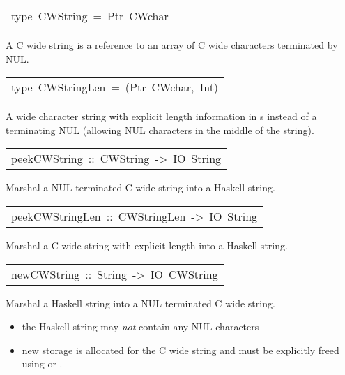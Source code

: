 \begin{haddockdesc}
\item[\begin{tabular}{@{}l}
type\ CWString\ =\ Ptr\ CWchar
\end{tabular}]\haddockbegindoc
A C wide string is a reference to an array of C wide characters
 terminated by NUL.
\par

\end{haddockdesc}
\begin{haddockdesc}
\item[\begin{tabular}{@{}l}
type\ CWStringLen\ =\ (Ptr\ CWchar,\ Int)
\end{tabular}]\haddockbegindoc
A wide character string with explicit length information in s
 instead of a terminating NUL (allowing NUL characters in the middle
 of the string).
\par

\end{haddockdesc}
\begin{haddockdesc}
\item[\begin{tabular}{@{}l}
peekCWString\ ::\ CWString\ ->\ IO\ String
\end{tabular}]\haddockbegindoc
Marshal a NUL terminated C wide string into a Haskell string.
\par

\end{haddockdesc}
\begin{haddockdesc}
\item[\begin{tabular}{@{}l}
peekCWStringLen\ ::\ CWStringLen\ ->\ IO\ String
\end{tabular}]\haddockbegindoc
Marshal a C wide string with explicit length into a Haskell string.
\par

\end{haddockdesc}
\begin{haddockdesc}
\item[\begin{tabular}{@{}l}
newCWString\ ::\ String\ ->\ IO\ CWString
\end{tabular}]\haddockbegindoc
Marshal a Haskell string into a NUL terminated C wide string.
\par
\begin{itemize}
\item
 the Haskell string may \emph{not} contain any NUL characters
\par

\item
 new storage is allocated for the C wide string and must
   be explicitly freed using  or
   .
\par

\end{itemize}

\end{haddockdesc}
